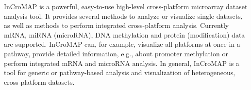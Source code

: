%
%
InCroMAP is a powerful, easy-to-use high-level cross-platform microarray dataset analysis tool. It provides several methods to analyze or visualize single datasets, as well as methods to perform integrated cross-platform analysis. Currently mRNA, miRNA (microRNA), DNA methylation and protein (modification) data are supported. InCroMAP can, for example, visualize all platforms at once in a pathway, provide detailed information, e.g., about promoter methylation or perform integrated mRNA and microRNA analysis. In general, InCroMAP is a tool for generic or pathway-based analysis and visualization of heterogeneous, cross-platform datasets. 
